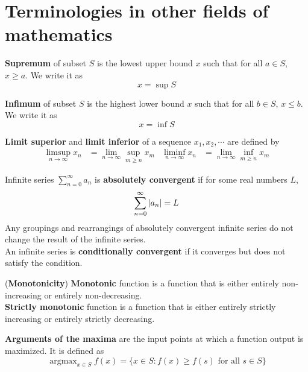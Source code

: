\documentclass{huhtakm-template-book}
\DeclareMathOperator*{\argmax}{argmax}
\begin{document}
\chapter{Terminologies in other fields of mathematics}
\begin{defn}
    \textbf{Supremum} of subset $S$ is the lowest upper bound $x$ such that for all $a\in S$, $x\geq a$. We write it as
    \begin{equation*}
        x=\sup S
    \end{equation*}
\end{defn}
\begin{defn}
    \textbf{Infimum} of subset $S$ is the highest lower bound $x$ such that for all $b\in S$, $x\leq b$. We write it as
    \begin{equation*}
        x=\inf S
    \end{equation*}
\end{defn}
\begin{defn}
    \textbf{Limit superior} and \textbf{limit inferior} of a sequence $x_{1},x_{2},\cdots$ are defined by
    \begin{align*}
        \limsup_{n\to\infty}x_{n}&=\lim_{n\to\infty}\sup_{m\geq n}x_{m} & \liminf_{n\to\infty}x_{n}&=\lim_{n\to\infty}\inf_{m\geq n}x_{m}
    \end{align*}
\end{defn}
\begin{defn}
    Infinite series $\sum_{n=0}^{\infty}a_{n}$ is \textbf{absolutely convergent} if for some real numbers $L$,
    \begin{equation*}
        \sum_{n=0}^{\infty}\left|{a_{n}}\right|=L
    \end{equation*}
    Any groupings and rearrangings of absolutely convergent infinite series do not change the result of the infinite series.\\
    An infinite series is \textbf{conditionally convergent} if it converges but does not satisfy the condition.
\end{defn}
\begin{defn}(\textbf{Monotonicity})
    \textbf{Monotonic} function is a function that is either entirely non-increasing or entirely non-decreasing.\\
    \textbf{Strictly monotonic} function is a function that is either entirely strictly increasing or entirely strictly decreasing.
\end{defn}
\begin{defn}
    \textbf{Arguments of the maxima} are the input points at which a function output is maximized. It is defined as
    \begin{equation*}
        \argmax_{x\in S}f(x)=\{x\in S:f(x)\geq f(s)\text{ for all }s\in S\}
    \end{equation*}
\end{defn}
\end{document}
